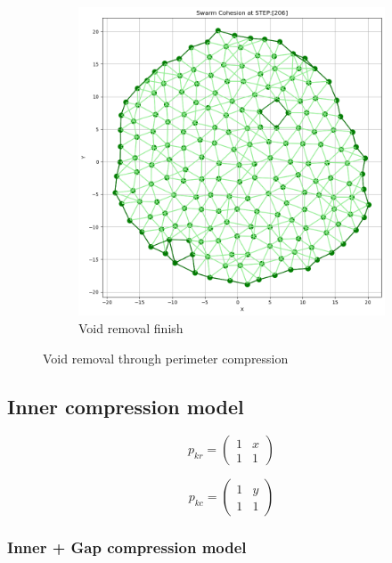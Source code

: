 \documentclass[12pt,a4paper]{IEEEtran}
\begin{document}
\begin{figure}[ht]
\begin{subfigure}{0.4\textwidth}
		\includegraphics[width=1.0\linewidth]{figures/voidRemoval2}
		\caption[Void removal finish]{Void removal finish}
		\label{fig:voidRemovalFinish}
	\end{subfigure}
	\caption{Void removal through perimeter compression}
	\label{fig:voidRemoval}
\end{figure}

\subsection{Inner compression model}

\begin{equation}
p_{kr} = \left (
\begin{array}{cc}
1 & x\\
1 & 1
\end{array} \right )
\end{equation}

\begin{equation}
p_{kc} = \left (
\begin{array}{cc}
1 & y\\
1 & 1
\end{array} \right )
\end{equation}

\subsubsection{Inner + Gap compression model}
\end{document}

